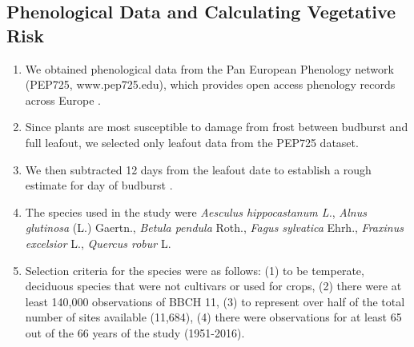\documentclass{article}\usepackage[]{graphicx}\usepackage[]{color}
\begin{document}
\subsection*{Phenological Data and Calculating Vegetative Risk}
\begin{enumerate}
\item We obtained phenological data from the Pan European Phenology network (PEP725, www.pep725.edu), which provides open access phenology records across Europe \citep{Templ2018}.
\item Since plants are most susceptible to damage from frost between budburst and full leafout, we selected only leafout data \citep[i.e., in][BBCH 11, which is defined as the point of leaf unfolding and the first visible leaf stalk]{Meier2001} from the PEP725 dataset.
\item We then subtracted 12 days from the leafout date to establish a rough estimate for day of budburst \citep{Donnelly2017}. 
\item The species used in the study were \textit{Aesculus hippocastanum L.}, \textit{Alnus glutinosa} (L.) Gaertn., \textit{Betula pendula} Roth., \textit{Fagus sylvatica} Ehrh., \textit{Fraxinus excelsior} L., \textit{Quercus robur} L.
\item Selection criteria for the species were as follows: (1) to be temperate, deciduous species that were not cultivars or used for crops, (2) there were at least 140,000 observations of BBCH 11, (3) to represent over half of the total number of sites available (11,684), (4) there were observations for at least 65 out of the 66 years of the study (1951-2016). %
\end{enumerate}
\end{document}
